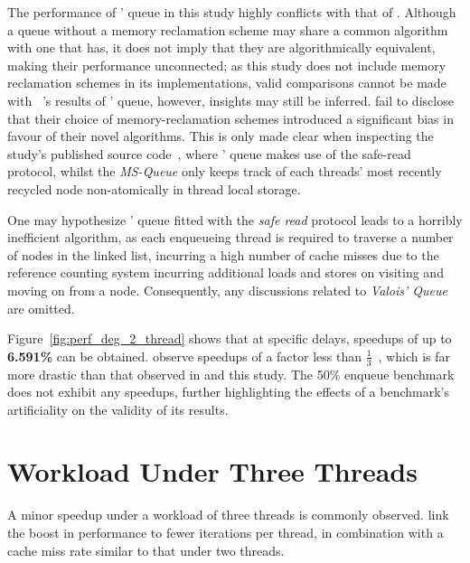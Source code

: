 The performance of \citeauthor{valois1994queues}' queue in this study highly
conflicts with that of \citep{michael1996simple}. Although a queue without a
memory reclamation scheme may share a common algorithm with one that has, it
does not imply that they are algorithmically equivalent, making their
performance unconnected; as this study does not include memory reclamation
schemes in its implementations, valid comparisons cannot be made with
~\citep{michael1996simple}'s results of \citeauthor{valois1994queues}' queue,
however, insights may still be inferred.
\citeauthor{michael1996simple} fail to disclose that their choice of
memory-reclamation schemes introduced a significant bias in favour of their
novel algorithms. 
This is only made clear when inspecting the study's published source
code~\citep{michael1996simple_sourcecode}, where \citeauthor{valois1994queues}' queue
makes use of the safe-read protocol, whilst the \emph{MS-Queue} only keeps
track of each threads' most recently recycled node non-atomically in thread
local storage.

One may hypothesize \citeauthor{valois1994queues}' queue fitted with the \emph{safe read}
protocol leads to a horribly inefficient algorithm, as each enqueueing thread
is required to traverse a number of nodes in the linked list, incurring a high
number of cache misses due to the reference counting system incurring
additional loads and stores on visiting and moving on from a node.
Consequently, any discussions related to \emph{Valois' Queue} are omitted.

Figure~\ref{fig:perf_deg_2_thread} shows that at specific delays, speedups of
up to \textbf{6.591\%} can be obtained.
\citeauthor{michael1996simple} observe speedups of a factor less than
$\frac{1}{3}$~\citep{michael1996simple}, which is far more drastic than that
observed in \citep{ladan2008optimistic, hoffman2007baskets} and this study. The
50\% enqueue benchmark does not exhibit any speedups, further highlighting the
effects of a benchmark's artificiality on the validity of its results.

\section{Workload Under Three Threads}
A minor speedup under a workload of three threads is commonly
observed\citep{ladan2008optimistic,michael1996simple,hoffman2007baskets}.
\citeauthor{michael1996simple} link the boost in performance to fewer
iterations per thread, in combination with a cache miss rate similar to that
under two threads.


